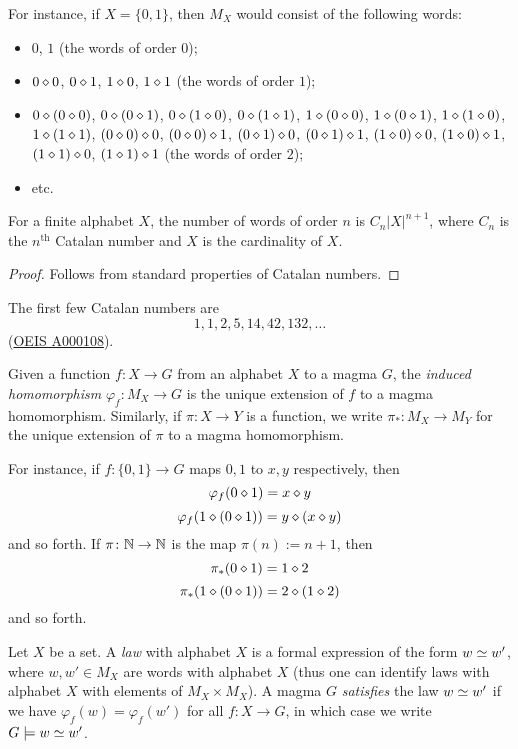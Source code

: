 For instance, if $X = \{0,1\}$, then $M_X$ would consist of the following words:
\begin{itemize}
  \item $0$, $1$ (the words of order $0$);
  \item $0 \diamond 0$, $0 \diamond 1$, $1 \diamond 0$, $1 \diamond 1$ (the words of order $1$);
  \item $0 \diamond (0 \diamond 0)$, $0 \diamond (0 \diamond 1)$, $0 \diamond (1 \diamond 0)$, $0 \diamond (1 \diamond 1)$, $1 \diamond (0 \diamond 0)$, $1 \diamond (0 \diamond 1)$, $1 \diamond (1 \diamond 0)$, $1 \diamond (1 \diamond 1)$, $(0 \diamond 0) \diamond 0$, $(0 \diamond 0) \diamond 1$, $(0 \diamond 1) \diamond 0$, $(0 \diamond 1) \diamond 1$, $(1 \diamond 0) \diamond 0$, $(1 \diamond 0) \diamond 1$, $(1 \diamond 1) \diamond 0$, $(1 \diamond 1) \diamond 1$ (the words of order $2$);
  \item etc.
\end{itemize}

\begin{lemma} \leanok {}
  For a finite alphabet $X$, the number of words of order $n$ is $C_n |X|^{n+1}$, where $C_n$ is the $n^{\mathrm{th}}$ Catalan number and $X$ is the cardinality of $X$.
\end{lemma}

\begin{proof} \leanok
  Follows from standard properties of Catalan numbers.
\end{proof}

The first few Catalan numbers are
$$ 1, 1, 2, 5, 14, 42, 132, \dots$$
(\href{https://oeis.org/A000108}{OEIS A000108}).

\begin{definition}\label{induced-def}
  Given a function $f: X \to G$ from an alphabet $X$ to a magma $G$, the \emph{induced homomorphism} $\varphi_f: M_X \to G$ is the unique extension of $f$ to a magma homomorphism.
  Similarly, if $\pi \colon X \to Y$ is a function, we write $\pi_* \colon M_X \to M_Y$ for the unique extension of $\pi$ to a magma homomorphism.
\end{definition}

For instance, if $f : \{0,1\} \to G$ maps $0,1$ to $x,y$ respectively, then
$$ \varphi_f(0 \diamond 1) = x \diamond y$$
$$ \varphi_f(1 \diamond (0 \diamond 1)) = y \diamond (x \diamond y)$$
and so forth. If $\pi \colon \mathbb{N} \to \mathbb{N}$ is the map $\pi(n) := n+1$, then
$$ \pi_*(0 \diamond 1) = 1 \diamond 2$$
$$ \pi_*(1 \diamond (0 \diamond 1)) = 2 \diamond (1 \diamond 2)$$
and so forth.

\begin{definition}[Law]\label{law-def}
  \leanok
  Let $X$ be a set. A \emph{law} with alphabet $X$ is a formal expression of the form $w \simeq w'$,
  where $w, w' \in M_X$ are words with alphabet $X$ (thus one can identify laws with alphabet $X$
  with elements of $M_X \times M_X$).
  A magma $G$ \emph{satisfies} the law $w \simeq w'$ if
  we have $\varphi_f( w ) = \varphi_f ( w' )$ for all $f: X \to G$, in which case we write
  $G \models w \simeq w'$.
\end{definition}

